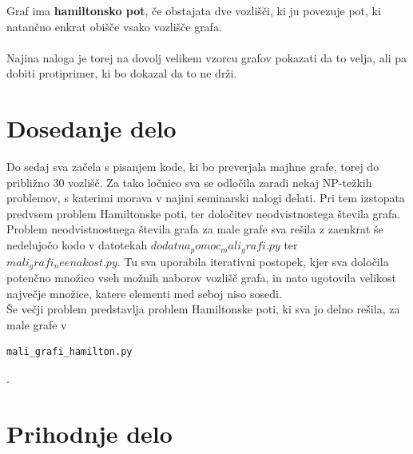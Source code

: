 \documentclass[12pt,a4paper]{amsart}
\begin{document}
Graf ima \textbf{hamiltonsko pot}, če obstajata dve vozlišči, ki ju povezuje pot, ki natančno enkrat obišče vsako vozlišče grafa.\\
\ \\
Najina naloga je torej na dovolj velikem vzorcu grafov pokazati da to velja, ali pa dobiti protiprimer, ki bo dokazal da to ne drži.\\
\section{Dosedanje delo}
Do sedaj sva začela s pisanjem kode, ki bo preverjala majhne grafe, torej do približno $30$ vozlišč. Za tako ločnico sva se odločila zaradi nekaj NP-težkih problemov, s katerimi morava v najini seminarski nalogi delati. Pri tem izstopata predvsem problem Hamiltonske poti, ter določitev neodvistnostega števila grafa. \\
Problem neodvistnostnega števila grafa za male grafe sva rešila z zaenkrat še nedelujočo kodo v datotekah $dodatna_pomoc_mali_grafi.py$ ter $mali_grafi_neenakost.py$. Tu sva uporabila iterativni postopek, kjer sva določila potenčno množico vseh možnih naborov vozlišč grafa, in nato ugotovila velikost največje množice, katere elementi med seboj niso sosedi.\\
Še večji problem predstavlja problem Hamiltonske poti, ki sva jo delno rešila, za male grafe v \begin{verbatim}mali_grafi_hamilton.py\end{verbatim}.
\section{Prihodnje delo}
\end{document}
